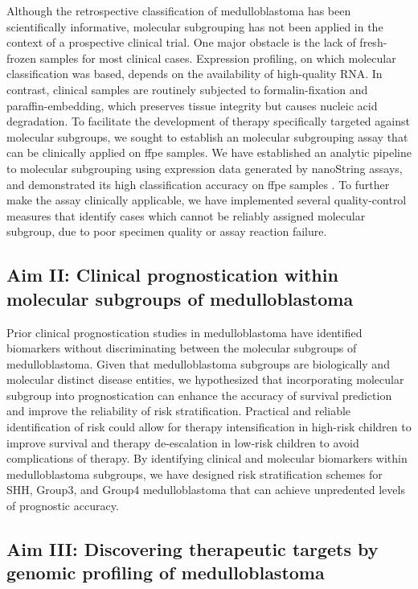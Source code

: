Although the retrospective classification of medulloblastoma has been scientifically informative, molecular subgrouping has not been applied in the context of a prospective clinical trial. One major obstacle is the lack of fresh-frozen samples for most clinical cases. Expression profiling, on which molecular classification was based, depends on the availability of high-quality RNA. In contrast, clinical samples are routinely subjected to formalin-fixation and paraffin-embedding, which preserves tissue integrity but causes nucleic acid degradation. To facilitate the development of therapy specifically targeted against molecular subgroups, we sought to establish an molecular subgrouping assay that can be clinically applied on \gls{ffpe} samples. We have established an analytic pipeline to molecular subgrouping using expression data generated by nanoString assays, and demonstrated its high classification accuracy on \gls{ffpe} samples . To further make the assay clinically applicable, we have implemented several quality-control measures that identify cases which cannot be reliably assigned molecular subgroup, due to poor specimen quality or assay reaction failure.

\subsection*{Aim II: Clinical prognostication within molecular subgroups of medulloblastoma}

Prior clinical prognostication studies in medulloblastoma have identified biomarkers without discriminating between the molecular subgroups of medulloblastoma. Given that medulloblastoma subgroups are biologically and molecular distinct disease entities, we hypothesized that incorporating molecular subgroup into prognostication can enhance the accuracy of survival prediction and improve the reliability of risk stratification. Practical and reliable identification of risk could allow for therapy intensification in high-risk children to improve survival and therapy de-escalation in low-risk children to avoid complications of therapy. By identifying clinical and molecular biomarkers within medulloblastoma subgroups, we have designed risk stratification schemes for SHH, Group3, and Group4 medulloblastoma that can achieve unpredented levels of prognostic accuracy.

\subsection*{Aim III: Discovering therapeutic targets by genomic profiling of medulloblastoma}


